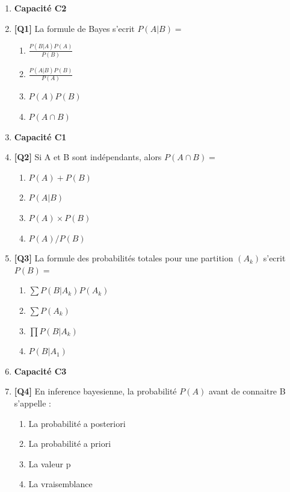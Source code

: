 \begin{enumerate}

\item[] \textbf{Capacité C2}

\item \textbf{[Q1]} La formule de Bayes s'ecrit $P(A|B) =$
  \begin{enumerate}[label=\Alph*.]
    \item $\frac{P(B|A)P(A)}{P(B)}$
    \item $\frac{P(A|B)P(B)}{P(A)}$
    \item $P(A) P(B)$
    \item $P(A \cap B)$
  \end{enumerate}

\item[] \textbf{Capacité C1}

\item \textbf{[Q2]} Si A et B sont indépendants, alors $P(A \cap B) =$
  \begin{enumerate}[label=\Alph*.]
    \item $P(A) + P(B)$
    \item $P(A|B)$
    \item $P(A) \times P(B)$
    \item $P(A)/P(B)$
  \end{enumerate}

\item \textbf{[Q3]} La formule des probabilités totales pour une partition $(A_k)$ s'ecrit $P(B) =$
  \begin{enumerate}[label=\Alph*.]
    \item $\sum P(B|A_k) P(A_k)$
    \item $\sum P(A_k)$
    \item $\prod P(B|A_k)$
    \item $P(B|A_1)$
  \end{enumerate}

\item[] \textbf{Capacité C3}

\item \textbf{[Q4]} En inference bayesienne, la probabilité $P(A)$ avant de connaitre B s'appelle :
  \begin{enumerate}[label=\Alph*.]
    \item La probabilité a posteriori
    \item La probabilité a priori
    \item La valeur p
    \item La vraisemblance
  \end{enumerate}


\end{enumerate}
